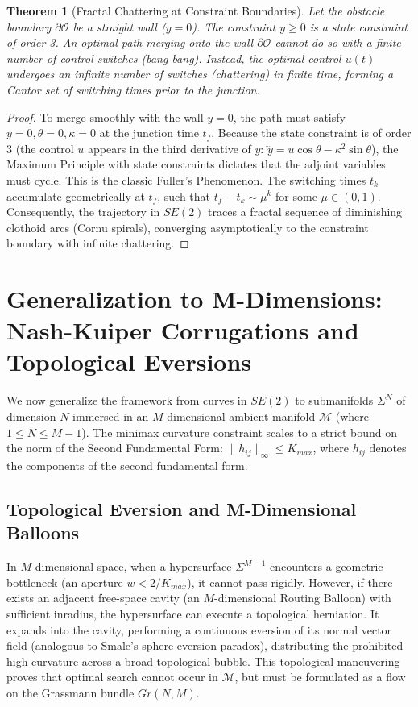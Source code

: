 \documentclass[12pt, a4paper]{article}
\newtheorem{theorem}{Theorem}[section]
\begin{document}
\begin{theorem}[Fractal Chattering at Constraint Boundaries]
Let the obstacle boundary $\partial \mathcal{O}$ be a straight wall ($y=0$). The constraint $y \ge 0$ is a state constraint of order 3. An optimal path merging onto the wall $\partial \mathcal{O}$ cannot do so with a finite number of control switches (bang-bang). Instead, the optimal control $u(t)$ undergoes an infinite number of switches (chattering) in finite time, forming a Cantor set of switching times prior to the junction.
\end{theorem}
\begin{proof}
To merge smoothly with the wall $y=0$, the path must satisfy $y=0, \theta=0, \kappa=0$ at the junction time $t_f$. Because the state constraint is of order 3 (the control $u$ appears in the third derivative of $y$: $\dddot{y} = u \cos \theta - \kappa^2 \sin \theta$), the Maximum Principle with state constraints dictates that the adjoint variables must cycle. This is the classic Fuller's Phenomenon.
The switching times $t_k$ accumulate geometrically at $t_f$, such that $t_{f} - t_k \sim \mu^k$ for some $\mu \in (0,1)$. Consequently, the trajectory in $SE(2)$ traces a fractal sequence of diminishing clothoid arcs (Cornu spirals), converging asymptotically to the constraint boundary with infinite chattering.
\end{proof}

\section{Generalization to M-Dimensions: Nash-Kuiper Corrugations and Topological Eversions}

We now generalize the framework from curves in $SE(2)$ to submanifolds $\Sigma^N$ of dimension $N$ immersed in an $M$-dimensional ambient manifold $\mathcal{M}$ (where $1 \le N \le M-1$). The minimax curvature constraint scales to a strict bound on the norm of the Second Fundamental Form: $\|h_{ij}\|_{\infty} \le K_{max}$, where $h_{ij}$ denotes the components of the second fundamental form.

\subsection{Topological Eversion and M-Dimensional Balloons}
In $M$-dimensional space, when a hypersurface $\Sigma^{M-1}$ encounters a geometric bottleneck (an aperture $w < 2/K_{max}$), it cannot pass rigidly. However, if there exists an adjacent free-space cavity (an $M$-dimensional Routing Balloon) with sufficient inradius, the hypersurface can execute a topological herniation. It expands into the cavity, performing a continuous eversion of its normal vector field (analogous to Smale's sphere eversion paradox), distributing the prohibited high curvature across a broad topological bubble. This topological maneuvering proves that optimal search cannot occur in $\mathcal{M}$, but must be formulated as a flow on the Grassmann bundle $Gr(N, M)$.
\end{document}
